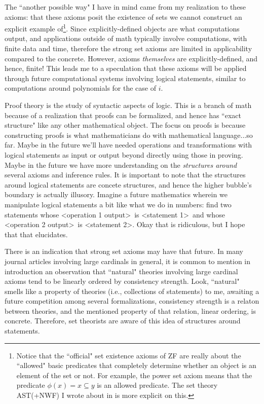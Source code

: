 \documentclass{article}
\theoremstyle{plain}
\begin{document}
The ``another possible way" I have in mind came from my realization to these axioms: that these axioms posit the existence of sets we cannot construct an explicit example of\footnote{Notice that the ``official" set existence axioms of \textsf{ZF} are really about the ``allowed" basic predicates that completely determine whether an object is an element of the set or not. For example, the power set axiom means that the predicate $\phi(x) = x \subseteq y$ is an allowed predicate. The set theory \textsf{AST(+NWF)} I wrote about in \cite{astnwf} is more explicit on this.}. Since explicitly-defined objects are what computations output, and applications outside of math typically involve computations, with finite data and time, therefore the strong set axioms are limited in applicability compared to the concrete. However, axioms \textit{themselves} are explicitly-defined, and hence, finite! This leads me to a speculation that these axioms will be applied through future computational systems involving logical statements, similar to computations around polynomials for the case of $i$.

Proof theory is the study of syntactic aspects of logic. This is a branch of math because of a realization that proofs can be formalized, and hence has ``exact structure" like any other mathematical object. The focus on proofs is because constructing proofs is what mathematicians do with mathematical language...so far. Maybe in the future we'll have needed operations and transformations with logical statements as input or output beyond directly using those in proving. Maybe in the future we have more understanding on the \textit{structures around} several axioms and inference rules. It is important to note that the structures around logical statements are concete structures, and hence the higher bubble's boundary is actually illusory. Imagine a future mathematics wherein we manipulate logical statements a bit like what we do in numbers: find two statements whose \textless operation 1 output\textgreater\ is \textless statement 1\textgreater\ and whose \textless operation 2 output\textgreater\ is \textless statement 2\textgreater. Okay that is ridiculous, but I hope that that elucidates.

There is an indication that strong set axioms may have that future. In many journal articles involving large cardinals in general, it is common to mention in introduction an observation that ``natural" theories involving large cardinal axioms tend to be linearly ordered by consistency strength\cite{hamkins2025}. Look, ``natural" smells like a property of theories (i.e., collections of statements) to me, awaiting a future competition among several formalizations, consistency strength is a relaton between theories, and the mentioned property of that relation, linear ordering, is concrete. Therefore, set theorists are aware of this idea of structures around statements.
\end{document}
